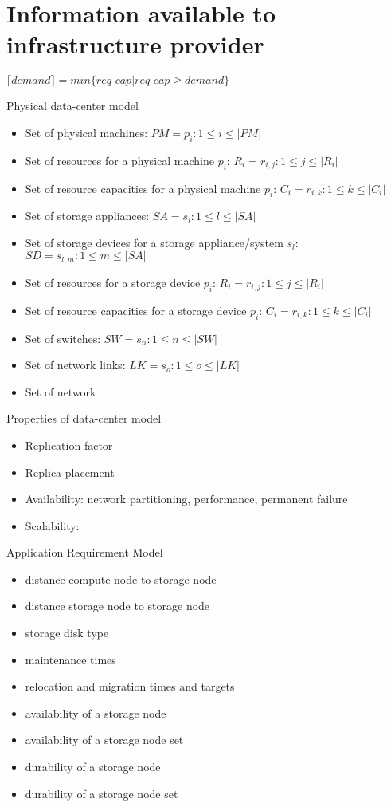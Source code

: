 \section{Information available to infrastructure provider}

$\lceil demand \rceil = min \{req\_cap | req\_cap \geq demand \}$

Physical data-center model
\begin{itemize}
	\item Set of physical machines: $PM={p_i : 1 \leq i \leq |PM|}$
	\item Set of resources for a physical machine $p_i$: $R_i={r_{i,j} : 1 \leq j \leq |R_i|}$
	\item Set of resource capacities for a physical machine $p_i$: $C_i={r_{i,k} : 1 \leq k \leq |C_i|}$
	\item Set of storage appliances: $SA={s_l : 1 \leq l \leq |SA|}$ %
	\item Set of storage devices for a storage appliance/system $s_l$: $SD={s_{l,m} : 1 \leq m \leq |SA|}$
	\item Set of resources for a storage device $p_i$: $R_i={r_{i,j} : 1 \leq j \leq |R_i|}$
	\item Set of resource capacities for a storage device $p_i$: $C_i={r_{i,k} : 1 \leq k \leq |C_i|}$
	\item Set of switches: $SW={s_n : 1 \leq n \leq |SW|}$ %
	\item Set of network links: $LK={s_o : 1 \leq o \leq |LK|}$
	\item Set of network
\end{itemize}

Properties of data-center model
\begin{itemize}
	\item Replication factor
	\item Replica placement
	\item Availability: network partitioning, performance, permanent failure
	\item Scalability: 
\end{itemize}


Application Requirement Model

\begin{itemize}
\item distance compute node to storage node
\item distance storage node to storage node
\item storage disk type
\item maintenance times
\item relocation and migration times and targets
\item availability of a storage node
\item availability of a storage node set
\item durability of a storage node
\item durability of a storage node set
\end{itemize}

